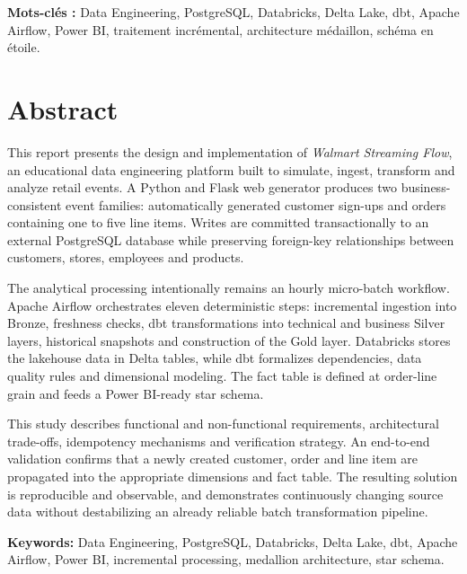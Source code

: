 \textbf{Mots-clés :} Data Engineering, PostgreSQL, Databricks, Delta Lake, dbt, Apache Airflow, Power BI, traitement incrémental, architecture médaillon, schéma en étoile.

\clearpage
\chapter*{Abstract}
This report presents the design and implementation of \emph{Walmart Streaming Flow}, an educational data engineering platform built to simulate, ingest, transform and analyze retail events. A Python and Flask web generator produces two business-consistent event families: automatically generated customer sign-ups and orders containing one to five line items. Writes are committed transactionally to an external PostgreSQL database while preserving foreign-key relationships between customers, stores, employees and products.

The analytical processing intentionally remains an hourly micro-batch workflow. Apache Airflow orchestrates eleven deterministic steps: incremental ingestion into Bronze, freshness checks, dbt transformations into technical and business Silver layers, historical snapshots and construction of the Gold layer. Databricks stores the lakehouse data in Delta tables, while dbt formalizes dependencies, data quality rules and dimensional modeling. The fact table is defined at order-line grain and feeds a Power BI-ready star schema.

This study describes functional and non-functional requirements, architectural trade-offs, idempotency mechanisms and verification strategy. An end-to-end validation confirms that a newly created customer, order and line item are propagated into the appropriate dimensions and fact table. The resulting solution is reproducible and observable, and demonstrates continuously changing source data without destabilizing an already reliable batch transformation pipeline.

\textbf{Keywords:} Data Engineering, PostgreSQL, Databricks, Delta Lake, dbt, Apache Airflow, Power BI, incremental processing, medallion architecture, star schema.
